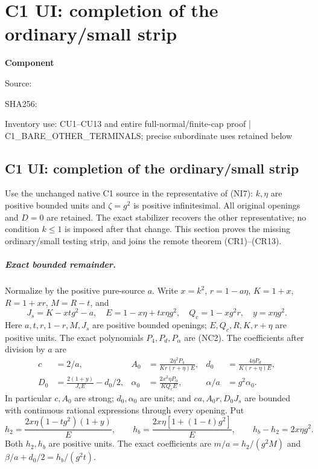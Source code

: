 \chapter{C1 UI: completion of the ordinary/small strip}
\label{component:pa0b854a04f49}
\noindent\textbf{Component }\par
{\small\noindent Source: \par}
{\small\noindent SHA256: \par}
{\small\noindent Inventory use: CU1--CU13 and entire full-normal/finite-cap proof | C1\_\allowbreak{}BARE\_\allowbreak{}OTHER\_\allowbreak{}TERMINALS; precise subordinate uses retained below\par}
\medskip
\section{C1 UI: completion of the ordinary/small strip}
\label{pa0b854a04f49:sec:r6-c1-ui}
Use the unchanged native C1 source in the representative of (NI7):
$k,\eta$ are positive bounded units and $\zeta=g^2$ is positive
infinitesimal. All original openings and $D=0$ are retained.
The exact stabilizer recovers the other representative; no condition
$k\le1$ is imposed after that change. This section proves the missing
ordinary/small testing strip, and joins the remote theorem (CR1)--(CR13).

\paragraph{Exact bounded remainder.}
Normalize by the positive pure-source $a$. Write $x=k^2$,
$r=1-a\eta$, $K=1+x$, $R=1+xr$, $M=R-t$, and
\[
 J_s=K-xtg^2-a,\quad E=1-x\eta+tx\eta g^2,\quad
 Q_c=1-xg^2r,\quad y=x\eta g^2.
\]
Here $a,t,r,1-r,M,J_s$ are positive bounded openings; $E,Q_c,R,K,r+\eta$
are positive units. The exact polynomials $P_4,P_d,P_\alpha$ are (NC2).
The coefficients after division by $a$ are
\[
\begin{aligned}
 c&=2/a,& A_0&=\frac{2\eta^2P_4}{Kr(r+\eta)E},&
 d_0&=\frac{4\eta P_d}{K(r+\eta)E},\\
 D_0&=\frac{2(1+y)}{J_sE}-d_0/2,&
 \alpha_0&=\frac{2x^2\eta P_\alpha}{KQ_cE},&
 \alpha/a&=g^2\alpha_0.
\end{aligned}                                                     \tag{CU1}
\]
In particular $c,A_0$ are strong; $d_0,\alpha_0$ are units; and
$ca,A_0r,D_0J_s$ are bounded with continuous rational expressions
through every opening. Put
\[
 h_2=\frac{2x\eta(1-tg^2)(1+y)}E,\qquad
 h_b=\frac{2x\eta[1+(1-t)g^2]}E,
 \qquad h_b-h_2=2x\eta g^2.
\]
Both $h_2,h_b$ are positive units. The exact coefficients are
$m/a=h_2/(g^2M)$ and $\beta/a+d_0/2=h_b/(g^2t)$.

